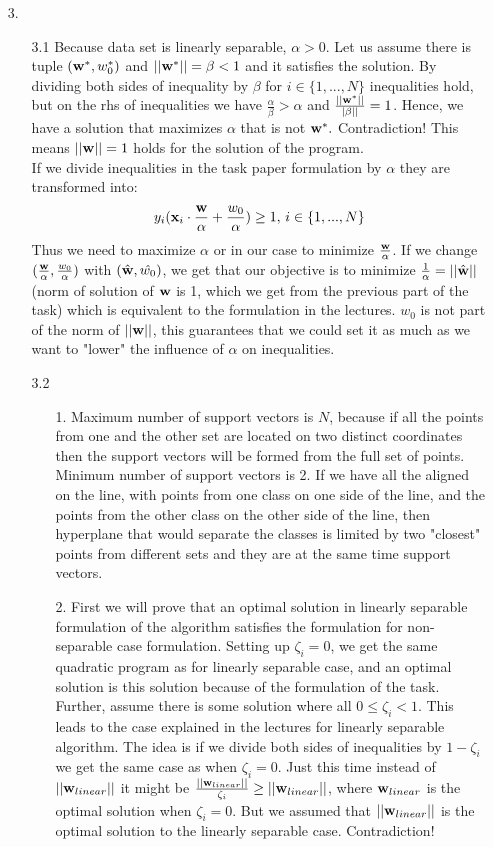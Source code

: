\documentclass[10pt,a4paper]{article}
\begin{document}
\begin{enumerate}
\item[3.]
\begin{enumerate}
\item[3.1]
Because data set is linearly separable, $\alpha > 0$.
Let us assume there is tuple $(\textbf{\text{{w}}}^*, w_0^*)$ and $||\textbf{\text{{w}}}^*|| = \beta < 1$ and it satisfies the solution. By dividing both sides of inequality by $\beta$ for $i\in \{ 1, ..., N\}$ inequalities hold, but on the rhs of inequalities we have $\frac{\alpha}{\beta} > \alpha$ and $\frac{||\textbf{\text{{w}}}^*||}{|\beta||} = 1$. Hence, we have a solution that maximizes $\alpha$ that is not $\textbf{\text{{w}}}^*.$ Contradiction! This means $||\textbf{\text{{w}}}||=1$ holds for the solution of the program. \\
If we divide inequalities in the task paper formulation by $\alpha$ they are transformed into:
$$y_i(\textbf{\text{{x}}}_i\cdot \frac{\textbf{\text{{w}}}}{\alpha} + \frac{w_0}{\alpha})\geq 1,\, i\in \{1, ..., N\}$$ Thus we need to maximize $\alpha$ or in our case to minimize $\frac{\textbf{\text{{w}}}}{\alpha}$. If we change $(\frac{\textbf{\text{{w}}}}{\alpha}, \frac{w_0}{\alpha})$ with $(\hat{\textbf{\text{{w}}}}, \hat{w_0})$, we get that our objective is to minimize $\frac{1}{\alpha} = ||\hat{\textbf{\text{{w}}}}||$ (norm of solution of $\textbf{\text{{w}}}$ is 1, which we get from the previous part of the task) which is equivalent to the formulation in the lectures. $w_0$ is not part of the norm of $||\textbf{\text{{w}}}||$, this guarantees that we could set it as much as we want to "lower" the influence of $\alpha$ on inequalities. 
\item[3.2]
\begin{enumerate}
\item[1.]
Maximum number of support vectors is $N$, because if all the points from one and the other set are located on two distinct coordinates then the support vectors will be formed from the full set of points. Minimum number of support vectors is 2. If we have all the aligned on the line, with points from one class on one side of the line, and the points from the other class on the other side of the line, then hyperplane that would separate the classes is limited by two "closest" points from different sets and they are at the same time support vectors.
\item[2.]
First we will prove that an optimal solution in linearly separable formulation of the algorithm satisfies the formulation for non-separable case formulation. Setting up $\zeta_i = 0$, we get the same quadratic program as for linearly separable case, and an optimal solution is this solution because of the formulation of the task.
 \\Further, assume there is some solution where all $ 0 \leq \zeta_i < 1$. This leads to the case explained in the lectures for linearly separable algorithm. The idea is if we divide both sides of inequalities by $1-\zeta_i$ we get the same case as when $\zeta_i=0$. Just this time instead of $||\textbf{\text{{w}}}_{linear}||$ it might be $\frac{||\textbf{\text{{w}}}_{linear}||}{\zeta_i}\geq ||\textbf{\text{{w}}}_{linear}||$, where $\textbf{\text{{w}}}_{linear}$ is the optimal solution when $\zeta_i=0$. But we assumed that $||\textbf{\text{{w}}}_{linear}||$ is the optimal solution to the linearly separable case. Contradiction!

\end{enumerate}
\end{enumerate}
\end{enumerate}
\end{document}
